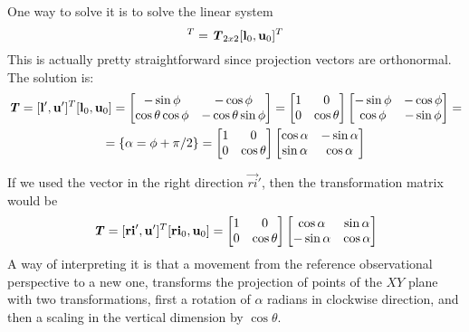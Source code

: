 One way to solve it is to solve the linear system 
\begin{equation}
[\vec{l}', \vec{u}']^T = \myMatrix{T}_{2x2} [\vec{l}_0, \vec{u}_0]^T
\end{equation}
This is actually pretty straightforward since projection vectors are orthonormal. The solution is:
\begin{multline}
\bm{\mathit{T}} = [\mathbf{l}', \mathbf{u}']^T [\mathbf{l}_0, \mathbf{u}_0] = \begin{bmatrix}
-\sin\phi & -\cos\phi \\
\cos\theta \cos\phi & -\cos\theta \sin\phi
\end{bmatrix} = \begin{bmatrix}
1 & 0\\
0 & \cos\theta
\end{bmatrix} \begin{bmatrix}
-\sin\phi & -\cos\phi \\
\cos\phi & -\sin\phi
\end{bmatrix} = \\
= \left\{\alpha = \phi + \pi/2\right\} = \begin{bmatrix}
	1 & 0\\
	0 & \cos\theta
\end{bmatrix} \begin{bmatrix}
	\cos\alpha & -\sin\alpha \\
	\sin\alpha & \cos\alpha
\end{bmatrix}
\end{multline}

If we used the vector in the right direction $\vec{ri}'$, then the transformation matrix would be
\begin{equation}
\bm{\mathit{T}} = [\mathbf{ri}', \mathbf{u}']^T [\mathbf{ri}_0, \mathbf{u}_0] =  \begin{bmatrix}
1 & 0\\
0 & \cos\theta
\end{bmatrix} \begin{bmatrix}
\cos\alpha & \sin\alpha \\
-\sin\alpha & \cos\alpha
\end{bmatrix}
\end{equation}
A way of interpreting it is that a movement from the reference observational perspective to a new one, transforms the projection of points of the $XY$ plane with two transformations, first a rotation of $\alpha$ radians in clockwise direction, and then a scaling in the vertical dimension by $\cos\theta$.

